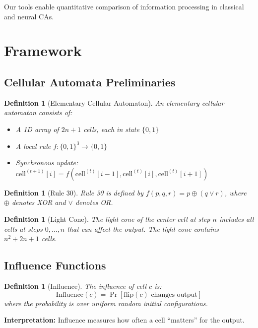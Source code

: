 \documentclass[11pt]{article}
\newtheorem{definition}[theorem]{Definition}
\begin{document}
Our tools enable quantitative comparison of information processing in classical and neural CAs.

\section{Framework}

\subsection{Cellular Automata Preliminaries}

\begin{definition}[Elementary Cellular Automaton]
An elementary cellular automaton consists of:
\begin{itemize}
    \item A 1D array of $2n+1$ cells, each in state $\{0, 1\}$
    \item A local rule $f: \{0,1\}^3 \to \{0,1\}$
    \item Synchronous update: $\text{cell}^{(t+1)}[i] = f(\text{cell}^{(t)}[i-1], \text{cell}^{(t)}[i], \text{cell}^{(t)}[i+1])$
\end{itemize}
\end{definition}

\begin{definition}[Rule 30]
Rule 30 is defined by $f(p,q,r) = p \oplus (q \lor r)$, where $\oplus$ denotes XOR and $\lor$ denotes OR.
\end{definition}

\begin{definition}[Light Cone]
The light cone of the center cell at step $n$ includes all cells at steps $0,\ldots,n$ that can affect the output. The light cone contains $n^2 + 2n + 1$ cells.
\end{definition}

\subsection{Influence Functions}

\begin{definition}[Influence]
The influence of cell $c$ is:
\begin{equation}
\text{Influence}(c) = \Pr[\text{flip}(c) \text{ changes output}]
\end{equation}
where the probability is over uniform random initial configurations.
\end{definition}

\textbf{Interpretation:} Influence measures how often a cell ``matters'' for the output.
\end{document}
